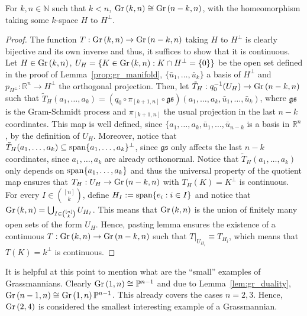 \begin{lemma} \label{lem:gr_duality} For $k,n\in\mathbb{N}$ such that $k<n$, $\Gr{k}{n}\cong\Gr{n-k}{n}$, with the homeomorphism taking some $k$-space $H$ to $H^{\perp}$.
\end{lemma}

\begin{proof} The function $T:\Gr{k}{n}\to\Gr{n-k}{n}$ taking $H$ to $H^{\perp}$ is clearly bijective and its own inverse and thus, it suffices to show that it is continuous. Let $H\in\Gr{k}{n}$, $U_H=\{K\in\Gr{k}{n}:K\cap H^{\perp}=\{0\}\}$ be the open set defined in the proof of Lemma~\ref{prop:gr_manifold}, $\{\bar{u}_1,\ldots,\bar{u}_k\}$ a basis of $H^{\perp}$ and $p_{H^{\perp}}:\mathbb{R}^n\to H^{\perp}$ the orthogonal projection. Then, let $\tilde{T}_H:q_0^{-1}(U_H)\to\Gr{n-k}{n}$ such that $\tilde{T}_H(a_1,\ldots,a_k)=(q_0\circ \pi_{[k+1,n]}\circ\mathfrak{gs})(a_1,\ldots,a_k,\bar{u}_1,\ldots,\bar{u}_k)$, where $\mathfrak{gs}$ is the Gram-Schmidt process and $\pi_{[k+1,n]}$ the usual projection in the last $n-k$ coordinates. This map is well defined, since $\{a_1,\ldots,a_k,\bar{u}_1,\ldots,\bar{u}_{n-k}$ is a basis in $\mathbb{R}^n$, by the definition of $U_H$. Moreover, notice that $\tilde{T}_H(a_1,\ldots,a_k)\subseteq\mathrm{span}\{a_1,\ldots,a_k\}^{\perp}$, since $\mathfrak{gs}$ only affects the last $n-k$ coordinates, since $a_1,\ldots,a_k$ are already orthonormal. Notice that $\tilde{T}_H(a_1,\ldots,a_k)$ only depends on $\mathrm{span}\{a_1,\ldots,a_k\}$ and thus the universal property of the quotient map ensures that $T_H:U_H\to\Gr{n-k}{n}$ with $T_H(K)=K^{\perp}$ is continuous. For every $I\in\binom{[n]}{k}$, define $H_I:=\mathrm{span}\{e_i:i\in I\}$ and notice that $\Gr{k}{n}=\bigcup_{I\in\binom{[n]}{k}}U_{H_I}$. This means that $\Gr{k}{n}$ is the union of finitely many open sets of the form $U_H$. Hence, pasting lemma ensures the existence of a continuous $T:\Gr{k}{n}\to\Gr{n-k}{n}$ such that $T|_{U_{H_i}}\equiv T_{H_i}$, which means that $T(K)=k^{\perp}$ is continuous.
\end{proof}

It is helpful at this point to mention what are the ``small'' examples of Grassmannians. Clearly $\Gr{1}{n}\cong\mathbb{P}^{n-1}$ and due to Lemma~\ref{lem:gr_duality}, $\Gr{n-1}{n}\cong\Gr{1}{n}\mathbb{P}^{n-1}$. This already covers the cases $n=2,3$. Hence, $\Gr{2}{4}$ is considered the smallest interesting example of a Grassmannian.

